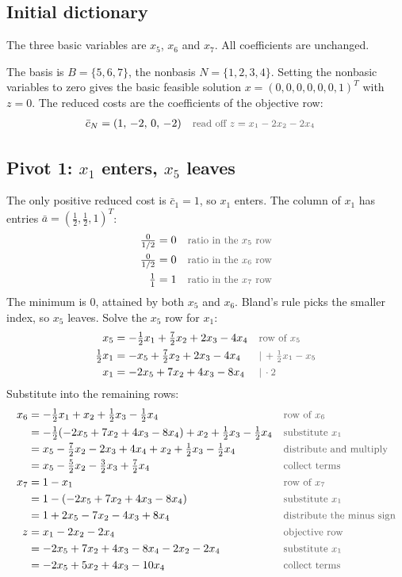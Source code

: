 \documentclass[a4paper,11pt]{article}
\newcommand{\teil}[1]{\subsection*{#1}}
\newcommand{\why}[1]{\text{\small\color{black!65}#1}}
\begin{document}
\teil{Initial dictionary}
The three basic variables are $x_5$, $x_6$ and $x_7$. All coefficients are unchanged.\par
The basis is $B=\{5,6,7\}$, the nonbasis $N=\{1,2,3,4\}$. Setting the nonbasic variables to zero gives the basic feasible solution $x=(0,0,0,0,0,0,1)^T$ with $z=0$. The reduced costs are the coefficients of the objective row:
\begin{align*}
\bar c_N &= (1,\,-2,\,0,\,-2) && \why{read off $z = x_1 - 2x_2 - 2x_4$}
\end{align*}

\teil{Pivot 1: $x_1$ enters, $x_5$ leaves}
The only positive reduced cost is $\bar c_1=1$, so $x_1$ enters. The column of $x_1$ has entries $\bar a = (\tfrac12,\tfrac12,1)^T$:
\begin{align*}
\tfrac{0}{1/2} &= 0 && \why{ratio in the $x_5$ row}\\
\tfrac{0}{1/2} &= 0 && \why{ratio in the $x_6$ row}\\
\tfrac{1}{1} &= 1 && \why{ratio in the $x_7$ row}
\end{align*}
The minimum is $0$, attained by both $x_5$ and $x_6$. Bland's rule picks the smaller index, so $x_5$ leaves. Solve the $x_5$ row for $x_1$:
\begin{align*}
x_5 &= -\tfrac12 x_1 + \tfrac72 x_2 + 2x_3 - 4x_4 && \why{row of $x_5$}\\
\tfrac12 x_1 &= -x_5 + \tfrac72 x_2 + 2x_3 - 4x_4 && \why{$|\,+\tfrac12 x_1 - x_5$}\\
x_1 &= -2x_5 + 7x_2 + 4x_3 - 8x_4 && \why{$|\,\cdot 2$}
\end{align*}
Substitute into the remaining rows:
\begin{align*}
x_6 &= -\tfrac12 x_1 + x_2 + \tfrac12 x_3 - \tfrac12 x_4 && \why{row of $x_6$}\\
&= -\tfrac12(-2x_5 + 7x_2 + 4x_3 - 8x_4) + x_2 + \tfrac12 x_3 - \tfrac12 x_4 && \why{substitute $x_1$}\\
&= x_5-\tfrac72x_2-2x_3+4x_4+x_2+\tfrac12x_3-\tfrac12x_4 && \why{distribute and multiply}\\
&= x_5 - \tfrac52 x_2 - \tfrac32 x_3 + \tfrac72 x_4 && \why{collect terms}\\
x_7 &= 1 - x_1 && \why{row of $x_7$}\\
&=1-(-2x_5+7x_2+4x_3-8x_4) && \why{substitute $x_1$}\\
&= 1 + 2x_5 - 7x_2 - 4x_3 + 8x_4 && \why{distribute the minus sign}\\
z &= x_1 - 2x_2 - 2x_4 && \why{objective row}\\
&= -2x_5 + 7x_2 + 4x_3 - 8x_4 - 2x_2 - 2x_4 && \why{substitute $x_1$}\\
&= -2x_5 + 5x_2 + 4x_3 - 10x_4 && \why{collect terms}
\end{align*}
\end{document}

